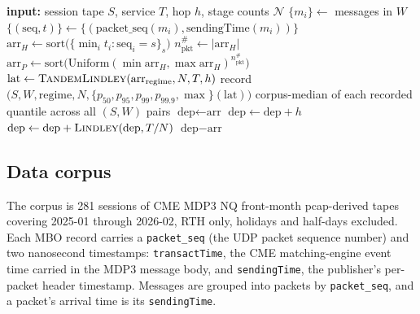 \documentclass[11pt]{article}
\begin{document}
\begin{algorithm}[H]
\caption{Per-window procedure of the empirical experiment.}
\label{alg:sweep}
\begin{algorithmic}[1]
\State \textbf{input:} session tape $S$, service $T$, hop $h$, stage counts $\mathcal{N}$
    \State $\{m_i\} \gets$ messages in $W$
    \State $\{(\text{seq}, t)\} \gets \{(\text{packet\_seq}(m_i), \text{sendingTime}(m_i))\}$
    \State $\text{arr}_H \gets \text{sort}\big(\{\min_i t_i : \text{seq}_i = s\}_s\big)$ 
    \State $n_{\mathrm{pkt}}^{\#} \gets |\text{arr}_H|$
    \State $\text{arr}_P \gets \text{sort}\big(\text{Uniform}(\min \text{arr}_H, \max \text{arr}_H)^{n_{\mathrm{pkt}}^{\#}}\big)$ 
        \State $\text{lat} \gets \textsc{TandemLindley}(\text{arr}_{\text{regime}}, N, T, h)$
        \State record $\big(S, W, \text{regime}, N, \{p_{50}, p_{95}, p_{99}, p_{99.9}, \max\}(\text{lat})\big)$
    \EndFor
\EndFor
\State \Return corpus-median of each recorded quantile across all $(S, W)$ pairs
    \State $\text{dep} \gets \text{arr}$
         $\text{dep} \gets \text{dep} + h$ \EndIf
        \State $\text{dep} \gets \text{dep} + \textsc{Lindley}(\text{dep}, T/N)$
    \EndFor
    \State \Return $\text{dep} - \text{arr}$
\EndFunction
\end{algorithmic}
\end{algorithm}

\subsection{Data corpus}
\label{sec:setup-data}

The corpus is 281 sessions of CME MDP3 NQ front-month pcap-derived tapes
covering 2025-01 through 2026-02, RTH only, holidays and half-days excluded. Each MBO
record carries a \texttt{packet\_seq} (the UDP packet sequence number) and two
nanosecond timestamps: \texttt{transactTime}, the CME matching-engine event time carried
in the MDP3 message body, and \texttt{sendingTime}, the publisher's per-packet header
timestamp. Messages are grouped into packets by \texttt{packet\_seq}, and a packet's
arrival time is its \texttt{sendingTime}.
\end{document}
